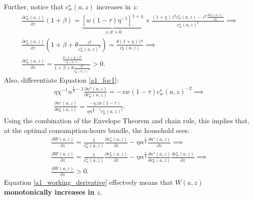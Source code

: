  Further, notice that $c_w^\star (a,z)$ increases in $z$:
 \begin{subequations}
    \begin{align}
        & \frac{\partial c_w^\star (a,z)}{\partial z} (1+\beta)=\underbrace{\left[w (1-\tau) \eta^{-1} \right]^{1+\chi}}_{\equiv \theta >0 }\times  \frac{(1+\chi)z^\chi c_w^\star (a,z) - z^\chi \frac{\partial c_w^\star (a,z)}{\partial z} }{c_w^\star (a,z)^2} \implies \\
        & \frac{\partial c_w^\star (a,z)}{\partial z} \left(1+\beta +\theta \frac{z^\chi}{c_w^\star (a,z)^2}\right)= \frac{\theta  (1+\chi) z^\chi }{c_w^\star (a,z)} \implies \\
        & \frac{\partial c_w^\star (a,z)}{\partial z} = \frac{\frac{\theta  (1+\chi) z^\chi }{c_w^\star (a,z)} }{1+\beta +\theta \frac{z^\chi}{c_w^\star (a,z)^2}} >0. 
    \end{align}
 \end{subequations}
Also, differentiate Equation \eqref{a1_foc1}:
\begin{subequations}
    \begin{align}
        & \eta \chi^{-1} n^{\frac{1}{\chi}-1} \frac{\partial n^\star (a,z)}{\partial c_w^\star (a,z)}=-zw(1-\tau) c_w^\star (a,z)^{-2} \implies \\
        & \frac{\partial n^\star (a,z)}{\partial c_w^\star (a,z)}=\frac{-\chi zw(1-\tau)}{\eta n^{\frac{1}{\chi}-1}c_w^\star (a,z)^{2}}.
    \end{align}
\end{subequations}
Using the combination of the Envelope Theorem and chain rule, this implies that, at the optimal consumption-hours bundle, the household sees:
\begin{subequations}
    \begin{align}
        & \frac{\partial W(a,z)}{\partial z}= \frac{1}{c_w^\star (a,z)} \frac{\partial c_w^\star (a,z)}{\partial z} -\eta n^{\frac{1}{\chi}}\frac{\partial n^\star (a,z)}{\partial z} \implies \\
        & \frac{\partial W(a,z)}{\partial z}= \frac{1}{c_w^\star (a,z)} \frac{\partial c_w^\star (a,z)}{\partial z} -\eta n^{\frac{1}{\chi}}\frac{\partial n^\star (a,z)}{\partial c_w^\star (a,z)} \frac{\partial c_w^\star (a,z)}{\partial z} \implies \\
        & \boxed{\frac{\partial W(a,z)}{\partial z} >0.} \label{a1_working_derivative}
    \end{align}
\end{subequations}
Equation \eqref{a1_working_derivative} effectvely means that \textcolor{BurntOrange}{\textbf{$W(a,z)$ monotonically increases in $z$}}. \\


